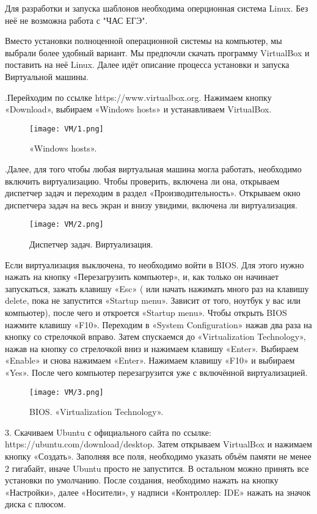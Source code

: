 Для разработки и запуска шаблонов необходима оперционная система Linux. Без неё не возможна работа с "ЧАС ЕГЭ".

Вместо установки полноценной операционной системы на компьютер, мы выбрали более удобный вариант. Мы предпочли скачать программу VirtualBox и поставить на неё Linux. Далее идёт описание процесса установки и запуска Виртуальной машины.

.\quad Перейходим по ссылке https://www.virtualbox.org. Нажимаем кнопку «Download», выбираем «Windows hosts» и устанавливаем VirtualBox. 

\begin{figure}[h]	
		\centering
		\texttt{[image: VM/1.png]}
\caption{«Windows hosts».}
\label{ris:image}
\end{figure}

.\quad Далее, для того чтобы любая виртуальная машина могла работать, необходимо включить виртуализацию. Чтобы проверить, включена ли она, открываем диспетчер задач и переходим в раздел «Производительность». Открываем окно диспетчера задач на весь экран и внизу увидими, включена ли виртуализация.

\begin{figure}[h]
		\centering
		\texttt{[image: VM/2.png]}
\caption{Диспетчер задач. Виртуализация.}
\label{ris:image}
\end{figure}

\quad Если виртуализация выключена, то необходимо войти в BIOS. Для этого нужно нажать на кнопку «Перезагрузить компьютер», и, как только он начинает запускаться, зажать клавишу «Esc» ( или начать нажимать много раз на клавишу delete, пока не запустится «Startup menu». Зависит от того, ноутбук у вас или компьютер), после чего и откроется «Startup menu». Чтобы открыть BIOS нажмите клавишу «F10». Переходим в «System Configuration» нажав два раза на кнопку со стрелочкой вправо. Затем спускаемся до «Virtualization Technology», нажав на кнопку со стрелочкой вниз и нажимаем клавишу «Enter». Выбираем «Enable» и снова нажимаем «Enter». Нажимаем клавишу «F10» и выбираем «Yes». После чего компьютер перезагрузится уже с включённой виртуализацией.

\begin{figure}[h]
		\centering
		\texttt{[image: VM/3.png]}
\caption{BIOS. «Virtualization Technology».}
\label{ris:image}
\end{figure}

3. Скачиваем Ubuntu с официального сайта по ссылке: https://ubuntu.com/download/desktop. Затем открываем VirtualBox и нажимаем кнопку «Создать». Заполняя все поля, необходимо указать объём памяти не менее 2 гигабайт, иначе Ubuntu просто не запустится. В остальном можно принять все установки по умолчанию. После создания, необходимо нажать на кнопку «Настройки», далее «Носители», у надписи «Контроллер: IDE» нажать на значок диска с плюсом. 

